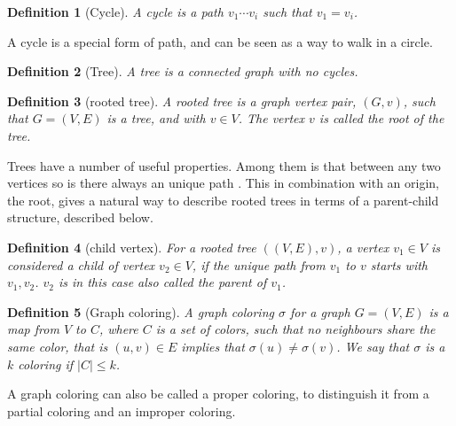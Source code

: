 \documentclass[a4paper]{article}
\newtheorem{definition}{Definition}[section]
\begin{document}
\begin{definition}[Cycle]
    A cycle is a path $v_1 \cdots v_i$ such that $v_1 = v_i$.
\end{definition}

A cycle is a special form of path, and can be seen as a way to walk
in a circle. 

\begin{definition}[Tree]{\cite{Trees}}
    A tree is a connected graph with no cycles.
\end{definition}
\begin{definition}[rooted tree]{\cite{Trees}}
    A rooted tree is a graph vertex pair, $(G,v)$, such that $G = (V,E)$ is a tree,
    and  with $v \in V$. The vertex $v$ is called the root of the tree.
\end{definition}

Trees have a number of useful properties. Among them is that between any two
vertices so is there always an unique path \cite{Trees}. This in combination
with an origin, the root, gives a natural way to describe rooted trees in terms
of a parent-child structure, described below.

\begin{definition}[child vertex]{\cite{Trees}}
    For a rooted tree $((V,E),v)$, a vertex $v_1 \in V$ is considered a child
    of vertex $v_2 \in V$, if the unique path from $v_1$ to $v$ starts with
    $v_1,v_2$. $v_2$ is in this case also called the parent of $v_1$.
\end{definition}


\begin{definition}[Graph coloring]
    A graph coloring $\sigma$ for a graph $G = (V,E)$ is a map from $V$ to $C$,
    where $C$ is a set of colors, such that no neighbours share the same color,
    that is $(u,v) \in E$ implies that $\sigma(u) \neq \sigma(v)$. We say that $\sigma$
    is a $k$ coloring if $|C| \leq k$.
\end{definition}
A graph coloring can also be called a proper coloring,
to distinguish it from a partial coloring and an improper coloring.
\end{document}
